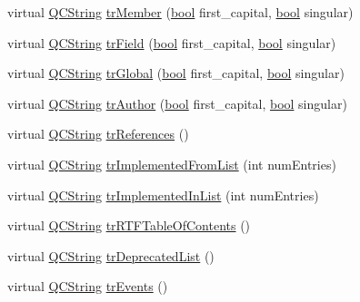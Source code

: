 \begin{DoxyCompactItemize}
\item 
virtual \hyperlink{class_q_c_string}{Q\+C\+String} \hyperlink{class_translator_norwegian_a0ef9f079ffda230be8149e31c1a32137}{tr\+Member} (\hyperlink{qglobal_8h_a1062901a7428fdd9c7f180f5e01ea056}{bool} first\+\_\+capital, \hyperlink{qglobal_8h_a1062901a7428fdd9c7f180f5e01ea056}{bool} singular)
\item 
virtual \hyperlink{class_q_c_string}{Q\+C\+String} \hyperlink{class_translator_norwegian_abfb0cb97df1bd5efb23308a6fb62ebcd}{tr\+Field} (\hyperlink{qglobal_8h_a1062901a7428fdd9c7f180f5e01ea056}{bool} first\+\_\+capital, \hyperlink{qglobal_8h_a1062901a7428fdd9c7f180f5e01ea056}{bool} singular)
\item 
virtual \hyperlink{class_q_c_string}{Q\+C\+String} \hyperlink{class_translator_norwegian_a8e11944b49ebc8039a1b572b550f9018}{tr\+Global} (\hyperlink{qglobal_8h_a1062901a7428fdd9c7f180f5e01ea056}{bool} first\+\_\+capital, \hyperlink{qglobal_8h_a1062901a7428fdd9c7f180f5e01ea056}{bool} singular)
\item 
virtual \hyperlink{class_q_c_string}{Q\+C\+String} \hyperlink{class_translator_norwegian_a8e2984e98ca9a2275203aa1a74dc9989}{tr\+Author} (\hyperlink{qglobal_8h_a1062901a7428fdd9c7f180f5e01ea056}{bool} first\+\_\+capital, \hyperlink{qglobal_8h_a1062901a7428fdd9c7f180f5e01ea056}{bool} singular)
\item 
virtual \hyperlink{class_q_c_string}{Q\+C\+String} \hyperlink{class_translator_norwegian_a57b022c381ab342200d6238488b2e4a5}{tr\+References} ()
\item 
virtual \hyperlink{class_q_c_string}{Q\+C\+String} \hyperlink{class_translator_norwegian_a0644c1c4b880ed462d96876938c96627}{tr\+Implemented\+From\+List} (int num\+Entries)
\item 
virtual \hyperlink{class_q_c_string}{Q\+C\+String} \hyperlink{class_translator_norwegian_a6bee34e08e47d65bd77b82f9dd0ee184}{tr\+Implemented\+In\+List} (int num\+Entries)
\item 
virtual \hyperlink{class_q_c_string}{Q\+C\+String} \hyperlink{class_translator_norwegian_aa637a1bd0dc9d29ea61e8fdfb02d0bc4}{tr\+R\+T\+F\+Table\+Of\+Contents} ()
\item 
virtual \hyperlink{class_q_c_string}{Q\+C\+String} \hyperlink{class_translator_norwegian_a7d8a0ed6dc7d5e3163a2a31fc3fd23e3}{tr\+Deprecated\+List} ()
\item 
virtual \hyperlink{class_q_c_string}{Q\+C\+String} \hyperlink{class_translator_norwegian_aa4affc21a7a8d6367dc1f1069316cc35}{tr\+Events} ()
\item 

\end{DoxyCompactItemize}
